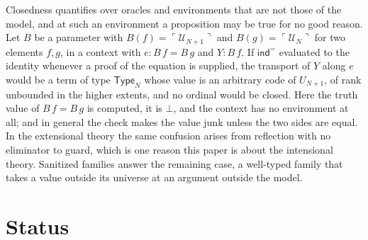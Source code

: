 \documentclass[10pt]{article}
\newcommand{\Type}{\mathsf{Type}}
\newcommand{\code}[1]{\ulcorner #1\urcorner}
\newcommand{\U}{\mathcal{U}}
\newcommand{\ind}{\mathsf{ind}}
\begin{document}
\begin{example}\label{ex:confusion}
Closedness quantifies over oracles and environments that are not those
of the model, and at such an environment a proposition may be true for
no good reason. Let $B$ be a parameter with $B(f)=\code{\U_{N+1}}$ and
$B(g)=\code{\U_N}$ for two elements $f,g$, in a context with
$e:B\,f=B\,g$ and $Y:B\,f$. If $\ind^=$ evaluated to the identity
whenever a proof of the equation is supplied, the transport of $Y$ along
$e$ would be a term of type $\Type_N$ whose value is an arbitrary code of
$U_{N+1}$, of rank unbounded in the higher extents, and no ordinal would
be closed. Here the truth value of $B\,f=B\,g$ is computed, it is
$\bot$, and the context has no environment at all; and in general the
check makes the value junk unless the two sides are equal. In the
extensional theory the same confusion arises from reflection with no
eliminator to guard, which is one reason this paper is about the
intensional theory. Sanitized families answer the remaining case, a
well-typed family that takes a value outside its universe at an
argument outside the model.
\end{example}

\section{Status}\label{sec:status}
\end{document}
